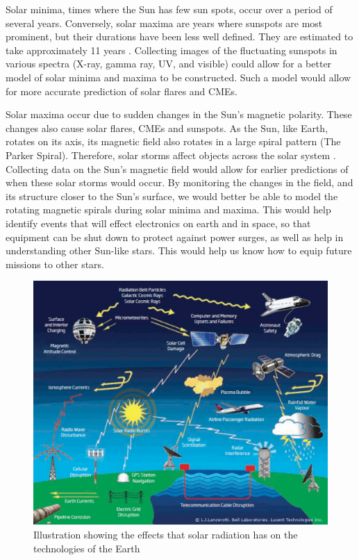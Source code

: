\documentclass[12pt]{article}
\begin{document}
\vspace{\baselineskip}

Solar minima, times where the Sun has few sun spots, occur over a period of several years. Conversely, solar maxima are years where sunspots are most prominent, but their durations have been less well defined. They are estimated to take approximately 11 years \cite{sundata}. Collecting images of the fluctuating sunspots in various spectra (X-ray, gamma ray, UV, and visible) could allow for a better model of solar minima and maxima to be constructed. Such a model would allow for more accurate prediction of solar flares and CMEs.

\vspace{\baselineskip}


Solar maxima occur due to sudden changes in the Sun's magnetic polarity. These changes also cause solar flares, CMEs and sunspots. As the Sun, like Earth, rotates on its axis, its magnetic field also rotates in a large spiral pattern (The Parker Spiral). Therefore, solar storms affect objects across the solar system \cite{solatsystemdata}. Collecting data on the Sun's magnetic field would allow for earlier predictions of when these solar storms would occur. By monitoring the changes in the field, and its structure closer to the Sun's surface, we would better be able to model the rotating magnetic spirals during solar minima and maxima. This would help identify events that will effect electronics on earth and in space, so that equipment can be shut down to protect against power surges, as well as help in understanding other Sun-like stars. This would help us know how to equip future missions to other stars. 

\begin{figure}[H]
    \centering
    \includegraphics[width = 12cm]{Media/Document/weather.png}
    \caption{Illustration showing the effects that solar radiation has on the technologies of the Earth \cite{whatisweather}}
    \label{magnetometer_diagram}
\end{figure}
\end{document}
